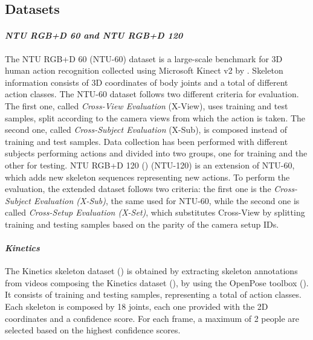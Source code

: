 \documentclass[times,twocolumn,final,authoryear]{elsarticle}
\begin{document}
\subsection{Datasets}

\paragraph*{\textbf{\textit{NTU RGB+D 60 and NTU RGB+D 120}}}{The NTU RGB+D 60 (NTU-60) dataset is a large-scale benchmark for 3D human action recognition collected using Microsoft Kinect v2 by \cite{ntu}. Skeleton information consists of 3D coordinates of  body joints and a total of  different action classes. The NTU-60 dataset follows two different criteria for evaluation. The first one, called \textit{Cross-View Evaluation} (X-View), uses  training and  test samples, split according to the camera views from which the action is taken. The second one, called \textit{Cross-Subject Evaluation} (X-Sub), is composed instead of  training and  test samples. Data collection has been performed with  different subjects performing actions and divided into two groups, one for training and the other for testing. NTU RGB+D 120 (\cite{ntu120}) (NTU-120) is an extension of NTU-60, which adds  new skeleton sequences representing  new actions. To perform the evaluation, the extended dataset follows two criteria: the first one is the \textit{Cross-Subject Evaluation (X-Sub)}, the same used for NTU-60, while the second one is called \textit{Cross-Setup Evaluation (X-Set)}, which substitutes Cross-View by splitting training and testing samples based on the parity of the camera setup IDs.  } 

\paragraph*{\textbf{\textit{Kinetics}}} The Kinetics skeleton dataset (\cite{yan2018spatial}) is obtained by extracting skeleton annotations from videos composing the Kinetics  dataset (\cite{Kin}), by using the OpenPose toolbox (\cite{openpose}). It consists of  training and  testing samples, representing a total of  action classes. Each skeleton is composed by 18 joints, each one provided with the 2D coordinates and a confidence score. For each frame, a maximum of 2 people are selected based on the highest confidence scores. 
\end{document}
